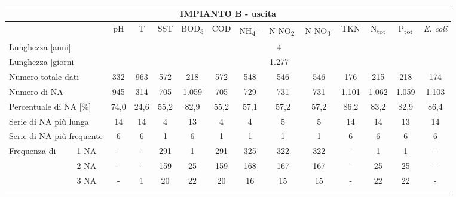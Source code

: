 \begin{sidewaystable}
\begin{center}
\scriptsize
	\begin{tabular}{|ll|c|c|c|c|c|c|c|c|c|c|c|c|}
		\hline
		\multicolumn{14}{|c|}{\textbf{IMPIANTO B - uscita}}                                                                                             \\ \hline
	\multicolumn{2}{|l|}{}                           & pH   & T       & SST   & BOD\textsubscript{5}  & COD  & NH\textsubscript{4}\textsuperscript{+} & N-NO\textsubscript{2}\textsuperscript{-} & N-NO\textsubscript{3}\textsuperscript{-} & TKN  & N\textsubscript{tot}  & P\textsubscript{tot}  & \textit{E. coli} \\ \hline
		\multicolumn{2}{|l|}{Lunghezza {[}anni{]}}       & \multicolumn{12}{c|}{4}                                                                      \\ \hline
		\multicolumn{2}{|l|}{Lunghezza {[}giorni{]}}     & \multicolumn{12}{c|}{1.277}                                                                  \\ \hline
		\multicolumn{2}{|l|}{Numero totale dati}         & 332  & 963  & 572  & 218   & 572  & 548  & 546    & 546    & 176   & 215   & 218   & 174     \\ \hline
		\multicolumn{2}{|l|}{Numero di NA}               & 945  & 314  & 705  & 1.059 & 705  & 729  & 731    & 731    & 1.101 & 1.062 & 1.059 & 1.103   \\ \hline
		\multicolumn{2}{|l|}{Percentuale di NA {[}\%{]}} & 74,0 & 24,6 & 55,2 & 82,9  & 55,2 & 57,1 & 57,2   & 57,2   & 86,2  & 83,2  & 82,9  & 86,4    \\ \hline
		\multicolumn{2}{|l|}{Serie di NA più lunga}      & 14   & 14   & 4    & 13    & 4    & 4    & 5      & 5      & 14    & 14    & 13    & 14      \\ \hline
		\multicolumn{2}{|l|}{Serie di NA più frequente}  & 6    & 6    & 1    & 6     & 1    & 1    & 1      & 1      & 6     & 6     & 6     & 6       \\ \hline
		\multirow{12}{*}{Frequenza di}      & 1 NA       & -    & -    & 291  & 1     & 291  & 325  & 322    & 322    & -     & 1     & 1     & -       \\ \cline{3-14} 
		& 2 NA       & -    & -    & 159  & 25    & 159  & 168  & 167    & 167    & -     & 25    & 25    & -       \\ \cline{3-14} 
		& 3 NA       & -    & 1    & 20   & 22    & 20   & 16   & 15     & 15     & -     & 22    & 22    & -       \\ \cline{3-14} 

\end{tabular}
\end{center}
\end{sidewaystable}
